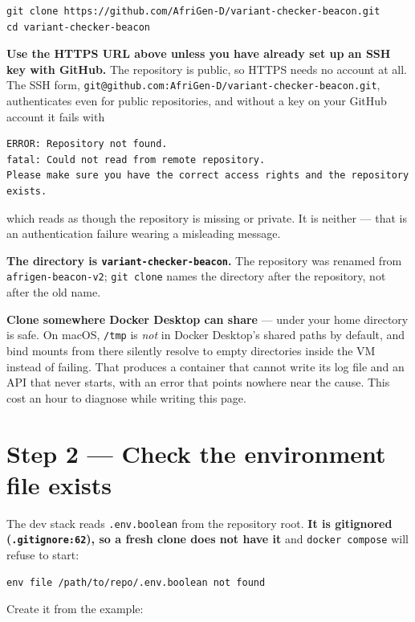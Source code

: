 \documentclass[
  10pt,
]{article}
\begin{document}
\begin{verbatim}
git clone https://github.com/AfriGen-D/variant-checker-beacon.git
cd variant-checker-beacon
\end{verbatim}

\textbf{Use the HTTPS URL above unless you have already set up an SSH
key with GitHub.} The repository is public, so HTTPS needs no account at
all. The SSH form,
\texttt{git@github.com:AfriGen-D/variant-checker-beacon.git},
authenticates even for public repositories, and without a key on your
GitHub account it fails with

\begin{verbatim}
ERROR: Repository not found.
fatal: Could not read from remote repository.
Please make sure you have the correct access rights and the repository exists.
\end{verbatim}

which reads as though the repository is missing or private. It is
neither --- that is an authentication failure wearing a misleading
message.

\textbf{The directory is \texttt{variant-checker-beacon}.} The
repository was renamed from \texttt{afrigen-beacon-v2};
\texttt{git\ clone} names the directory after the repository, not after
the old name.

\textbf{Clone somewhere Docker Desktop can share} --- under your home
directory is safe. On macOS, \texttt{/tmp} is \emph{not} in Docker
Desktop's shared paths by default, and bind mounts from there silently
resolve to empty directories inside the VM instead of failing. That
produces a container that cannot write its log file and an API that
never starts, with an error that points nowhere near the cause. This
cost an hour to diagnose while writing this page.

\section{Step 2 --- Check the environment file
exists}\label{step-2-check-the-environment-file-exists}

The dev stack reads \texttt{.env.boolean} from the repository root.
\textbf{It is gitignored (\texttt{.gitignore:62}), so a fresh clone does
not have it} and \texttt{docker\ compose} will refuse to start:

\begin{verbatim}
env file /path/to/repo/.env.boolean not found
\end{verbatim}

Create it from the example:
\end{document}
